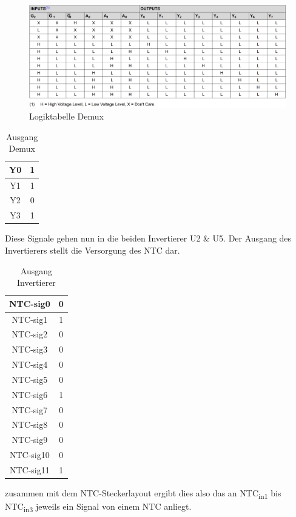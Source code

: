 \begin{figure}
	\centering
	\includegraphics[width=0.5\linewidth]{bilder/AMS_demuxer_logiktabelle}
	\caption{Logiktabelle Demux \cite{SN74HCS238}}
	\label{Demuxer_Logiktabelle}
\end{figure}

\FloatBarrier
\begin{table}
	\centering
	\caption{Ausgang Demux}
	\begin{tabular}{|c|c|}
		\hline
		Y0 & 1 \\
		\hline
		Y1 & 1 \\
		\hline
		Y2 & 0 \\
		\hline
		Y3 & 1 \\
		\hline
	\end{tabular}
\end{table}

Diese Signale gehen nun in die beiden Invertierer U2 \& U5. Der Ausgang des Invertierers stellt die Versorgung des \ac{NTC} dar.

\begin{table}
	\centering
	\caption{Ausgang Invertierer}
	\begin{tabular}{|c|c|}
		\hline
		NTC-sig0 & 0 \\
		\hline
		NTC-sig1 & 1 \\
		\hline
		NTC-sig2 & 0 \\
		\hline
		NTC-sig3 & 0 \\
		\hline
		NTC-sig4 & 0 \\
		\hline
		NTC-sig5 & 0 \\
		\hline
		NTC-sig6 & 1 \\
		\hline
		NTC-sig7 & 0 \\
		\hline
		NTC-sig8 & 0 \\
		\hline
		NTC-sig9 & 0 \\
		\hline
		NTC-sig10 & 0 \\
		\hline
		NTC-sig11 & 1 \\
		\hline
	\end{tabular}
\end{table}

zusammen mit dem \ac{NTC}-Steckerlayout ergibt dies also das an \ac{NTC}\textsubscript{in1} bis \ac{NTC}\textsubscript{in3} jeweils ein Signal von einem \ac{NTC} anliegt.

